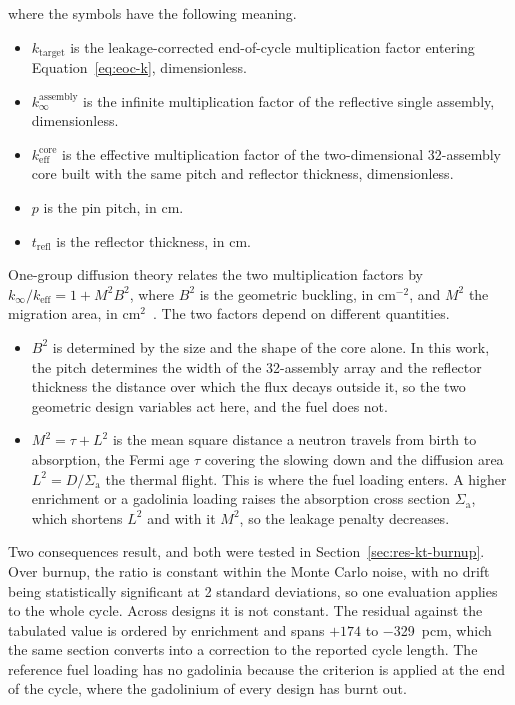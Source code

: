 \noindent where the symbols have the following meaning.

\begin{itemize}
  \item $k_\mathrm{target}$ is the leakage-corrected end-of-cycle multiplication factor entering Equation~\eqref{eq:eoc-k}, dimensionless.

  \item $k_\infty^\mathrm{assembly}$ is the infinite multiplication
        factor of the reflective single assembly, dimensionless.

  \item $k_\mathrm{eff}^\mathrm{core}$ is the effective multiplication
        factor of the two-dimensional 32-assembly core built with the
        same pitch and reflector thickness, dimensionless.

  \item $p$ is the pin pitch, in cm.

  \item $t_\mathrm{refl}$ is the reflector thickness, in cm.
\end{itemize}

One-group diffusion theory relates the two multiplication factors by
$k_\infty / k_\mathrm{eff} = 1 + M^2 B^2$, where $B^2$ is the geometric
buckling, in cm$^{-2}$, and $M^2$ the migration
area, in cm$^2$~\cite{duderstadt_hamilton_1976}. The two factors
depend on different quantities.

\begin{itemize}
  \item $B^2$ is determined by the size and the shape of the core
        alone. In this work, the pitch determines the width of the
        32-assembly array and the reflector thickness the distance over
        which the flux decays outside it, so the two geometric design
        variables act here, and the fuel does not.

  \item $M^2 = \tau + L^2$ is the mean square distance a neutron
        travels from birth to absorption, the Fermi age $\tau$ covering
        the slowing down and the diffusion area
        $L^2 = D / \Sigma_\mathrm{a}$ the thermal flight. This is where the fuel loading enters. A higher enrichment or a gadolinia
        loading raises the absorption cross section
        $\Sigma_\mathrm{a}$, which shortens $L^2$ and with it $M^2$, so the leakage penalty decreases.
\end{itemize}

Two consequences result, and both were tested in
Section~\ref{sec:res-kt-burnup}. Over burnup, the ratio is constant
within the Monte Carlo noise, with no drift being statistically significant at 2 standard
deviations, so one evaluation applies to the whole cycle. Across designs it
is not constant. The residual against the tabulated value is ordered by
enrichment and spans $+174$ to \SI{-329}{pcm}, which the same section
converts into a correction to the reported cycle length. The reference fuel loading has no gadolinia because the criterion is applied at the 
end of the cycle, where the gadolinium of every design has burnt out.

